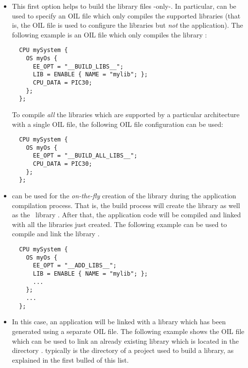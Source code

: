 \begin{itemize}

\item
  This first option helps to build the library files -only-. In
  particular,  can be used to specify an OIL file which
  only compiles the supported libraries (that is, the OIL file is used
  to configure the libraries but {\em not} the application). The
  following example is an OIL file which only compiles the library
  :

\begin{lstlisting}
  CPU mySystem {
    OS myOs {
      EE_OPT = "__BUILD_LIBS__";
      LIB = ENABLE { NAME = "mylib"; };
      CPU_DATA = PIC30;
    };
  };
\end{lstlisting}

\begin{note}
To compile {\em all} the libraries which are supported by a particular
architecture with a single OIL file, the following OIL file
configuration can be used:

\begin{lstlisting}
  CPU mySystem {
    OS myOs {
      EE_OPT = "__BUILD_ALL_LIBS__";
      CPU_DATA = PIC30;
    };
  };
\end{lstlisting}

\end{note}


\item
   can be used for the {\em on-the-fly} creation of the
  library during the application compilation process. That is, the
  build process will create the library as well as the \ee\ library
  . After that, the application code will be compiled
  and linked with all the libraries just created. The following
  example can be used to compile and link the library .

\begin{lstlisting}
  CPU mySystem {
    OS myOs {
      EE_OPT = "__ADD_LIBS__";
      LIB = ENABLE { NAME = "mylib"; };
      ...
    };
    ...
  };
\end{lstlisting}

\item
  In this case, an application will be linked with a library which has
  been generated using a separate OIL file. The following example
  shows the OIL file which can be used to link an already existing
  library which is located in the directory
  .  typically is the 
  directory of a project used to build a library, as explained in the
  first bulled of this list.


\end{itemize}

